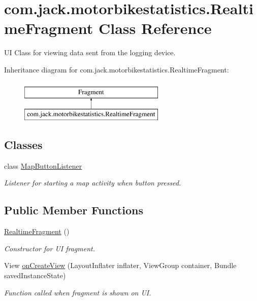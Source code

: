 \hypertarget{classcom_1_1jack_1_1motorbikestatistics_1_1_realtime_fragment}{}\section{com.\+jack.\+motorbikestatistics.\+Realtime\+Fragment Class Reference}
\label{classcom_1_1jack_1_1motorbikestatistics_1_1_realtime_fragment}


UI Class for viewing data sent from the logging device.  


Inheritance diagram for com.\+jack.\+motorbikestatistics.\+Realtime\+Fragment\+:\begin{figure}[H]
\begin{center}
\leavevmode
\includegraphics[height=2.000000cm]{classcom_1_1jack_1_1motorbikestatistics_1_1_realtime_fragment}
\end{center}
\end{figure}
\subsection*{Classes}
\begin{DoxyCompactItemize}
\item 
class \hyperlink{classcom_1_1jack_1_1motorbikestatistics_1_1_realtime_fragment_1_1_map_button_listener}{Map\+Button\+Listener}
\begin{DoxyCompactList}\small\item\em Listener for starting a map activity when button pressed. \end{DoxyCompactList}\end{DoxyCompactItemize}
\subsection*{Public Member Functions}
\begin{DoxyCompactItemize}
\item 
\hyperlink{classcom_1_1jack_1_1motorbikestatistics_1_1_realtime_fragment_a159b590184ccba28da3763c211edc82f}{Realtime\+Fragment} ()
\begin{DoxyCompactList}\small\item\em Constructor for UI fragment. \end{DoxyCompactList}\item 
View \hyperlink{classcom_1_1jack_1_1motorbikestatistics_1_1_realtime_fragment_a68850ca4bf4eabcdf4ed4005d5f0d4d7}{on\+Create\+View} (Layout\+Inflater inflater, View\+Group container, Bundle saved\+Instance\+State)
\begin{DoxyCompactList}\small\item\em Function called when fragment is shown on UI. \end{DoxyCompactList}\end{DoxyCompactItemize}
